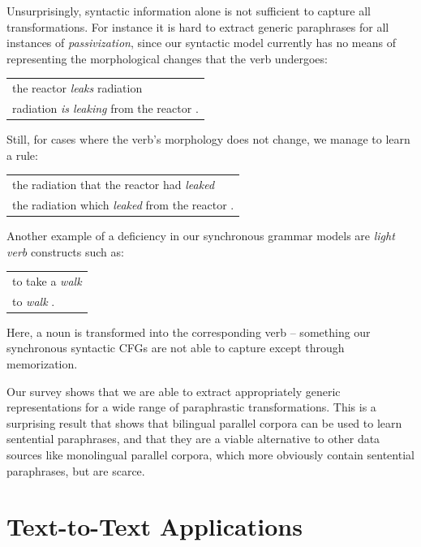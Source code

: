 \documentclass[11pt]{article}
\begin{document}
Unsurprisingly, syntactic information alone is not sufficient to
capture all transformations. For instance it is hard to extract
generic paraphrases for all instances of \emph{passivization}, since
our syntactic model currently has no means of representing the
morphological changes that the verb undergoes:
\begin{center}
\begin{tabular}{l}
  the reactor \emph{leaks} radiation \\
  radiation \emph{is leaking} from the reactor .\\
\end{tabular}
\end{center}
Still, for cases where the verb's morphology does not change, we
manage to learn a rule:
\begin{center}
\begin{tabular}{l}
  the radiation that the reactor had \emph{leaked} \\
  the radiation which \emph{leaked} from the reactor .\\
\end{tabular}
\end{center}
Another example of a deficiency in our synchronous grammar models are
\emph{light verb} constructs such as:
\begin{center}
\begin{tabular}{l}
  to take a \emph{walk} \\
  to \emph{walk} .
\end{tabular}
\end{center}
Here, a noun is transformed into the corresponding verb -- something
our synchronous syntactic CFGs are not able to capture except
through memorization.

Our survey shows that we are able to extract appropriately generic representations for a wide range of paraphrastic transformations.  This is a surprising result that shows that bilingual parallel corpora can be used to learn sentential paraphrases, and that they are a viable alternative to other data sources like monolingual parallel corpora, which more obviously contain sentential paraphrases, but are scarce.

\section{Text-to-Text Applications} \label{adaptation}
\end{document}
